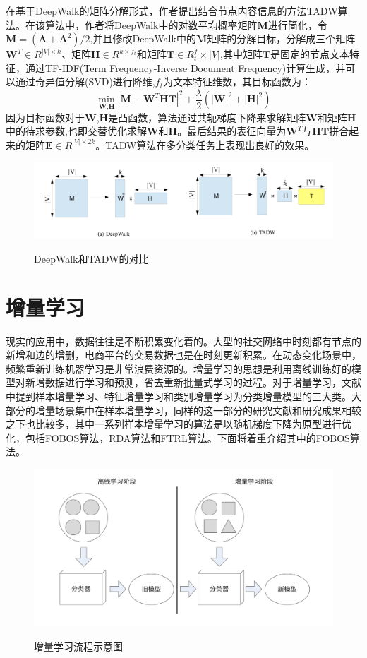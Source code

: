 在基于DeepWalk的矩阵分解形式，作者提出结合节点内容信息的方法TADW算法。在该算法中，作者将DeepWalk中的对数平均概率矩阵$\textbf{M}$进行简化，令$\textbf{M} = (\textbf{A}+\textbf{A}^2)/2$,并且修改DeepWalk中的$\textbf{M}$矩阵的分解目标，分解成三个矩阵$\textbf{W}^T \in R^{|V| \times k}$、矩阵$\textbf{H} \in R^{k\times f_t}$和矩阵$\textbf{T}\in R^f_t\times |V|$,其中矩阵$\textbf{T}$是固定的节点文本特征，通过TF-IDF(Term  Frequency-Inverse Document Frequency)计算生成，并可以通过奇异值分解(SVD)进行降维,$f_t$为文本特征维数，其目标函数为：
\begin{equation}
	\min_{\textbf{W},\textbf{H}} |\textbf{M}-\textbf{W}^T\textbf{H}\textbf{T}|^2 +\frac{\lambda}{2}(|\textbf{W}|^2+|\textbf{H}|^2)
\end{equation}
因为目标函数对于$\textbf{W}$,$\textbf{H}$是凸函数，算法通过共轭梯度下降来求解矩阵$\textbf{W}$和矩阵$\textbf{H}$中的待求参数,也即交替优化求解$\textbf{W}$和$\textbf{H}$。最后结果的表征向量为$\textbf{W}^T$与$\textbf{HT}$拼合起来的矩阵$\textbf{E}\in R^{|V|\times 2k}$。TADW算法在多分类任务上表现出良好的效果。
 \begin{figure}[!ht]
	\centering
	{\includegraphics[width=5in]{figures/tadw.png}}
	\caption{DeepWalk和TADW的对比}\label{tadw}
\end{figure}


\section{增量学习}
现实的应用中，数据往往是不断积累变化着的。大型的社交网络中时刻都有节点的新增和边的增删，电商平台的交易数据也是在时刻更新积累。在动态变化场景中，频繁重新训练机器学习是非常浪费资源的。增量学习的思想是利用离线训练好的模型对新增数据进行学习和预测，省去重新批量式学习的过程。对于增量学习，文献\cite{zhong2017survey}中提到样本增量学习、特征增量学习和类别增量学习为分类增量模型的三大类。大部分的增量场景集中在样本增量学习，同样的这一部分的研究文献和研究成果相较之下也比较多，其中一系列样本增量学习的算法是以随机梯度下降为原型进行优化，包括FOBOS算法，RDA算法和FTRL算法。下面将着重介绍其中的FOBOS算法。
 \begin{figure}[!ht]
	\centering
	{\includegraphics[width=5in]{figures/incremental_struct.png}}
	\caption{增量学习流程示意图}
\end{figure}

